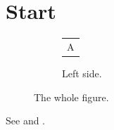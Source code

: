 \documentclass{article}
\begin{document}
\section{Start}
\begin{figure}[h]
\centering
\begin{subfigure}{0.4\textwidth}\centering\begin{tabular}{c}A\end{tabular}\caption{Left side.}\label{fa}\end{subfigure}
\caption{The whole figure.}\label{fw}
\end{figure}
See  and .
\end{document}
